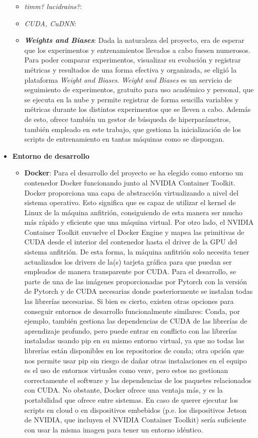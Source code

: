 \documentclass[a4paper, 11pt]{article}
\begin{document}
\begin{itemize}
\begin{itemize}
		\item \textit{timm? lucidrains?}:
		\item \textit{CUDA, CuDNN}:
		\item \textbf{\textit{Weights and Biases}}: Dada la naturaleza del proyecto, era de esperar que los experimentos y entrenamientos llevados a cabo fuesen numerosos. Para poder comparar experimentos, visualizar su evolución y registrar métricas y resultados de una forma efectiva y organizada, se eligió la plataforma \textit{Weight and Biases}. \textit{Weight and Biases} es un servicio de seguimiento de experimentos, gratuito para uso académico y personal, que se ejecuta en la nube y permite registrar de forma sencilla variables y métricas durante los distintos experimentos que se lleven a cabo. Además de esto, ofrece también un gestor de búsqueda de hiperparámetros, también empleado en este trabajo, que gestiona la inicialización de los scripts de entrenamiento en tantas máquinas como se dispongan. 
	\end{itemize}
	\item \textbf{Entorno de desarrollo}
	\begin{itemize}
		\item \textbf{Docker}: Para el desarrollo del proyecto se ha elegido como entorno un contenedor Docker funcionando junto al NVIDIA Container Toolkit. Docker proporciona una capa de abstracción virtualizando a nivel del sistema operativo. Esto significa que es capaz de utilizar el kernel de Linux de la máquina anfitrión, consiguiendo de esta manera ser mucho más rápido y eficiente que una máquina virtual. Por otro lado, el NVIDIA Container Toolkit envuelve el Docker Engine y mapea las primitivas de CUDA desde el interior del contenedor hasta el driver de la GPU del sistema anfitrión. De esta forma, la máquina anfitrión solo necesita tener actualizados los drivers de la(s) tarjeta gráfica para que puedan ser empleados de manera transparente por CUDA. Para el desarrollo, se parte de una de las imágenes proporcionadas por Pytorch con la versión de Pytorch y de CUDA necesarias donde posteriormente se instalan todas las librerías necesarias. Si bien es cierto, existen otras opciones para conseguir entornos de desarrollo funcionalmente similares: Conda, por ejemplo, también gestiona las dependencias de CUDA de las librerías de aprendizaje profundo, pero puede entrar en conflicto con las librerías instaladas usando pip en su mismo entorno virtual, ya que no todas las librerías están disponibles en los repositorios de conda; otra opción que nos permite usar pip sin riesgo de dañar otras instalaciones en el equipo es el uso de entornos virtuales como venv, pero estos no gestionan correctamente el software y las dependencias de los paquetes relacionados con CUDA. No obstante, Docker ofrece una ventaja más, y es la portabilidad que ofrece entre sistemas. En caso de querer ejecutar los scripts en cloud o en dispositivos embebidos (p.e. los dispositivos Jetson de NVIDIA, que incluyen el NVIDIA Container Toolkit) sería suficiente con usar la misma imagen para tener un entorno idéntico.

\end{itemize}
\end{itemize}
\end{document}
